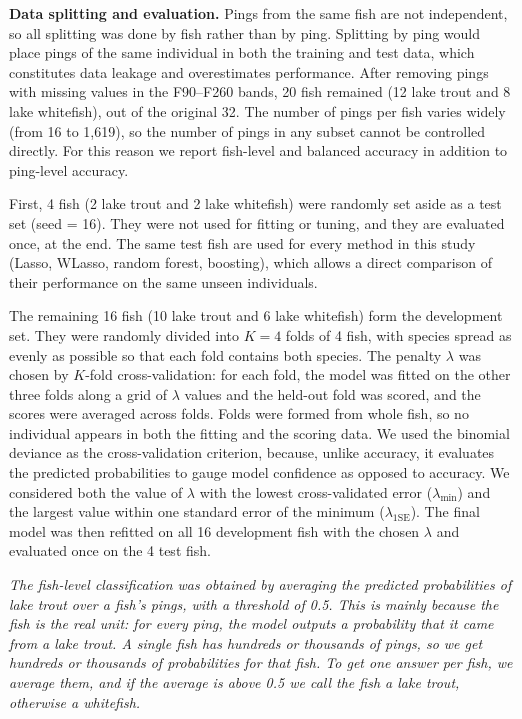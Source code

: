 \documentclass[
  letterpaper,
  DIV=11,
  numbers=noendperiod]{scrartcl}
\begin{document}
\textbf{Data splitting and evaluation.} Pings from the same fish are not
independent, so all splitting was done by fish rather than by ping.
Splitting by ping would place pings of the same individual in both the
training and test data, which constitutes data leakage and overestimates
performance. After removing pings with missing values in the F90--F260
bands, 20 fish remained (12 lake trout and 8 lake whitefish), out of the
original 32. The number of pings per fish varies widely (from 16 to
1,619), so the number of pings in any subset cannot be controlled
directly. For this reason we report fish-level and balanced accuracy in
addition to ping-level accuracy.

First, 4 fish (2 lake trout and 2 lake whitefish) were randomly set
aside as a test set (seed = 16). They were not used for fitting or
tuning, and they are evaluated once, at the end. The same test fish are
used for every method in this study (Lasso, WLasso, random forest,
boosting), which allows a direct comparison of their performance on the
same unseen individuals.

The remaining 16 fish (10 lake trout and 6 lake whitefish) form the
development set. They were randomly divided into \(K=4\) folds of 4
fish, with species spread as evenly as possible so that each fold
contains both species. The penalty \(\lambda\) was chosen by \(K\)-fold
cross-validation: for each fold, the model was fitted on the other three
folds along a grid of \(\lambda\) values and the held-out fold was
scored, and the scores were averaged across folds. Folds were formed
from whole fish, so no individual appears in both the fitting and the
scoring data. We used the binomial deviance as the cross-validation
criterion, because, unlike accuracy, it evaluates the predicted
probabilities to gauge model confidence as opposed to accuracy. We
considered both the value of \(\lambda\) with the lowest cross-validated
error (\(\lambda_{\min}\)) and the largest value within one standard
error of the minimum (\(\lambda_{1\mathrm{SE}}\)). The final model was
then refitted on all 16 development fish with the chosen \(\lambda\) and
evaluated once on the 4 test fish.

\emph{The fish-level classification was obtained by averaging the
predicted probabilities of lake trout over a fish's pings, with a
threshold of 0.5. This is mainly because the fish is the real unit: for
every ping, the model outputs a probability that it came from a lake
trout. A single fish has hundreds or thousands of pings, so we get
hundreds or thousands of probabilities for that fish. To get one answer
per fish, we average them, and if the average is above 0.5 we call the
fish a lake trout, otherwise a whitefish.}
\end{document}
